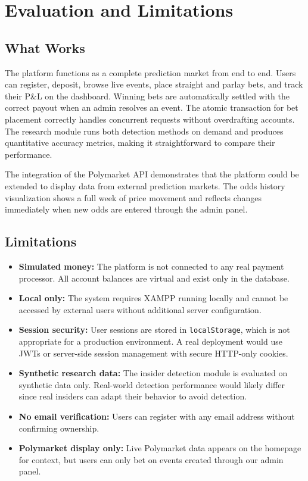 \documentclass[sigconf,nonacm]{acmart}
\begin{document}
\section{Evaluation and Limitations}

\subsection{What Works}
The platform functions as a complete prediction market from end to end.
Users can register, deposit, browse live events, place straight and
parlay bets, and track their P\&L on the dashboard. Winning bets are
automatically settled with the correct payout when an admin resolves
an event. The atomic transaction for bet placement correctly handles
concurrent requests without overdrafting accounts. The research module
runs both detection methods on demand and produces quantitative
accuracy metrics, making it straightforward to compare their
performance.

The integration of the Polymarket API demonstrates that the platform
could be extended to display data from external prediction markets.
The odds history visualization shows a full week of price movement and
reflects changes immediately when new odds are entered through the
admin panel.

\subsection{Limitations}
\begin{itemize}
  \item \textbf{Simulated money:} The platform is not connected to any
  real payment processor. All account balances are virtual and exist
  only in the database.
  \item \textbf{Local only:} The system requires XAMPP running locally
  and cannot be accessed by external users without additional server
  configuration.
  \item \textbf{Session security:} User sessions are stored in
  \texttt{localStorage}, which is not appropriate for a production
  environment. A real deployment would use JWTs or server-side
  session management with secure HTTP-only cookies.
  \item \textbf{Synthetic research data:} The insider detection module
  is evaluated on synthetic data only. Real-world detection performance
  would likely differ since real insiders can adapt their behavior to
  avoid detection.
  \item \textbf{No email verification:} Users can register with any
  email address without confirming ownership.
  \item \textbf{Polymarket display only:} Live Polymarket data appears
  on the homepage for context, but users can only bet on events created
  through our admin panel.
\end{itemize}
\end{document}
